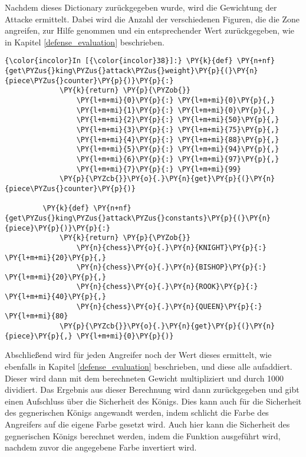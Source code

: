Nachdem dieses Dictionary zurückgegeben wurde, wird die Gewichtung der
Attacke ermittelt. Dabei wird die Anzahl der verschiedenen Figuren, die
die Zone angreifen, zur Hilfe genommen und ein entsprechender Wert
zurückgegeben, wie in Kapitel \ref{defense_evaluation} beschrieben.

    \begin{Verbatim}[commandchars=\\\{\}]
{\color{incolor}In [{\color{incolor}38}]:} \PY{k}{def} \PY{n+nf}{get\PYZus{}king\PYZus{}attack\PYZus{}weight}\PY{p}{(}\PY{n}{piece\PYZus{}counter}\PY{p}{)}\PY{p}{:}
             \PY{k}{return} \PY{p}{\PYZob{}}
                 \PY{l+m+mi}{0}\PY{p}{:} \PY{l+m+mi}{0}\PY{p}{,}
                 \PY{l+m+mi}{1}\PY{p}{:} \PY{l+m+mi}{0}\PY{p}{,}
                 \PY{l+m+mi}{2}\PY{p}{:} \PY{l+m+mi}{50}\PY{p}{,}
                 \PY{l+m+mi}{3}\PY{p}{:} \PY{l+m+mi}{75}\PY{p}{,}
                 \PY{l+m+mi}{4}\PY{p}{:} \PY{l+m+mi}{88}\PY{p}{,}
                 \PY{l+m+mi}{5}\PY{p}{:} \PY{l+m+mi}{94}\PY{p}{,}
                 \PY{l+m+mi}{6}\PY{p}{:} \PY{l+m+mi}{97}\PY{p}{,}
                 \PY{l+m+mi}{7}\PY{p}{:} \PY{l+m+mi}{99}
             \PY{p}{\PYZcb{}}\PY{o}{.}\PY{n}{get}\PY{p}{(}\PY{n}{piece\PYZus{}counter}\PY{p}{)}
         
         \PY{k}{def} \PY{n+nf}{get\PYZus{}king\PYZus{}attack\PYZus{}constants}\PY{p}{(}\PY{n}{piece}\PY{p}{)}\PY{p}{:}
             \PY{k}{return} \PY{p}{\PYZob{}}
                 \PY{n}{chess}\PY{o}{.}\PY{n}{KNIGHT}\PY{p}{:} \PY{l+m+mi}{20}\PY{p}{,}
                 \PY{n}{chess}\PY{o}{.}\PY{n}{BISHOP}\PY{p}{:} \PY{l+m+mi}{20}\PY{p}{,}
                 \PY{n}{chess}\PY{o}{.}\PY{n}{ROOK}\PY{p}{:} \PY{l+m+mi}{40}\PY{p}{,}
                 \PY{n}{chess}\PY{o}{.}\PY{n}{QUEEN}\PY{p}{:} \PY{l+m+mi}{80}
             \PY{p}{\PYZcb{}}\PY{o}{.}\PY{n}{get}\PY{p}{(}\PY{n}{piece}\PY{p}{,} \PY{l+m+mi}{0}\PY{p}{)}
\end{Verbatim}

    Abschließend wird für jeden Angreifer noch der Wert dieses ermittelt,
wie ebenfalls in Kapitel \ref{defense_evaluation} beschrieben, und diese alle aufaddiert.
Dieser wird dann mit dem berechneten Gewicht multipliziert und
durch 1000 dividiert. Das Ergebnis aus dieser Berechnung wird dann
zurückgegeben und gibt einen Aufschluss über die Sicherheit des Königs.
Dies kann auch für die Sicherheit des gegnerischen Königs angewandt
werden, indem schlicht die Farbe des Angreifers auf die eigene Farbe
gesetzt wird. Auch hier kann die Sicherheit des gegnerischen Königs
berechnet werden, indem die Funktion ausgeführt wird, nachdem zuvor die
angegebene Farbe invertiert wird.


